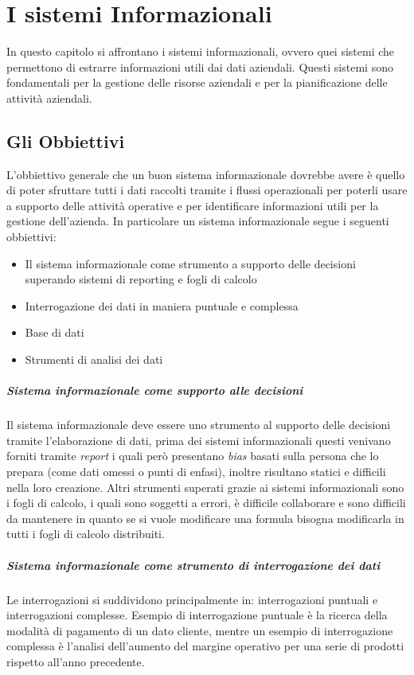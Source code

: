 \chapter{I sistemi Informazionali}
\thispagestyle{chapterInit}
In questo capitolo si affrontano i sistemi informazionali, ovvero quei sistemi che permettono di estrarre informazioni utili dai dati aziendali. Questi sistemi sono fondamentali per la gestione delle risorse aziendali e per la pianificazione delle attività aziendali.
\section{Gli Obbiettivi}
    L'obbiettivo generale che un buon sistema informazionale dovrebbe avere è quello di poter sfruttare tutti i dati raccolti tramite i flussi operazionali per poterli usare a supporto delle attività operative e per identificare informazioni utili per la gestione dell'azienda. In particolare un sistema informazionale segue i seguenti obbiettivi:
    \begin{itemize}
        \item Il sistema informazionale come strumento a supporto delle decisioni superando sistemi di reporting e fogli di calcolo
        \item Interrogazione dei dati in maniera puntuale e complessa 
        \item Base di dati 
        \item Strumenti di analisi dei dati
    \end{itemize}
    \paragraph{Sistema informazionale come supporto alle decisioni} Il sistema informazionale deve essere uno strumento al supporto delle decisioni tramite l'elaborazione di dati, prima dei sistemi informazionali questi venivano forniti tramite \textit{report} i quali però presentano \textit{bias} basati sulla persona che lo prepara (come dati omessi o punti di enfasi), inoltre risultano statici e difficili nella loro creazione. Altri strumenti superati grazie ai sistemi informazionali sono i fogli di calcolo, i quali sono soggetti a errori, è difficile collaborare e sono difficili da mantenere in quanto se si vuole modificare una formula bisogna modificarla in tutti i fogli di calcolo distribuiti.
    \paragraph{Sistema informazionale come strumento di interrogazione dei dati} Le interrogazioni si suddividono principalmente in: interrogazioni puntuali e interrogazioni complesse. Esempio di interrogazione puntuale è la ricerca della modalità di pagamento di un dato cliente, mentre un esempio di interrogazione complessa è l'analisi dell'aumento del margine operativo per una serie di prodotti rispetto all'anno precedente.
